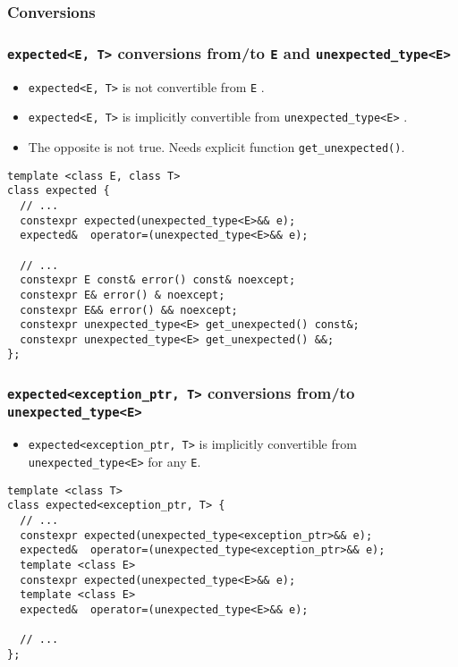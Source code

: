 \documentclass[xcolor=dvipsnames]{beamer}
\newcommand{\cpp}[1]{\lstinline{#1}}
\begin{document}
\subsubsection{Conversions}
\begin{frame}[fragile]
\frametitle{\cpp{expected<E, T>} conversions from/to \cpp{E} and \cpp{unexpected_type<E>}}

\begin{itemize}
\item \cpp{expected<E, T>} is not convertible from \cpp{E} .
\item \cpp{expected<E, T>} is implicitly convertible from \cpp{unexpected_type<E>} .
\item The opposite is not true. Needs explicit function \cpp{get_unexpected()}.
\end{itemize}

\begin{lstlisting}
template <class E, class T>
class expected {
  // ...
  constexpr expected(unexpected_type<E>&& e);
  expected&  operator=(unexpected_type<E>&& e);

  // ...  
  constexpr E const& error() const& noexcept;
  constexpr E& error() & noexcept;
  constexpr E&& error() && noexcept;
  constexpr unexpected_type<E> get_unexpected() const&;
  constexpr unexpected_type<E> get_unexpected() &&;
};
\end{lstlisting}

\end{frame}
\begin{frame}[fragile]
\frametitle{\cpp{expected<exception_ptr, T>} conversions from/to \cpp{unexpected_type<E>}}

\begin{itemize}
\item \cpp{expected<exception_ptr, T>} is implicitly convertible from \cpp{unexpected_type<E>}  for any \cpp{E}.
\end{itemize}

\begin{lstlisting}
template <class T>
class expected<exception_ptr, T> {
  // ...
  constexpr expected(unexpected_type<exception_ptr>&& e);
  expected&  operator=(unexpected_type<exception_ptr>&& e);
  template <class E>
  constexpr expected(unexpected_type<E>&& e);
  template <class E>
  expected&  operator=(unexpected_type<E>&& e);

  // ...  
};
\end{lstlisting}

\end{frame}
\end{document}
